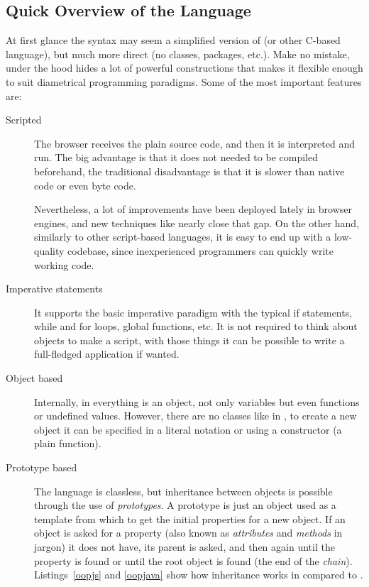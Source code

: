 \subsection{Quick Overview of the Language} %
\label{sub:overviewjavascript}

At first glance the syntax may seem a simplified version of  (or other C-based language), but much more direct (no classes, packages, etc.).
Make no mistake, under the hood  hides a lot of powerful constructions that makes it flexible enough to suit diametrical programming paradigms.
Some of the most important features are:

\begin{description}
  \item[Scripted] The browser receives the plain source code, and then it is interpreted and run.
  The big advantage is that it does not needed to be compiled beforehand, the traditional disadvantage is that it is slower than native code or even  byte code.
  
  Nevertheless, a lot of improvements have been deployed lately in browser engines, and new techniques like  nearly close that gap.
  On the other hand, similarly to other script-based languages, it is easy to end up with a low-quality codebase, since inexperienced programmers can quickly write working code.
  \item[Imperative statements] It supports the basic imperative paradigm with the typical if statements, while and for loops, global functions, etc.
  It is not required to think about objects to make a script, with those things it can be possible to write a full-fledged application if wanted.
  \item[Object based] Internally, in  everything is an object, not only variables but even functions or undefined values.
  However, there are no classes like in , to create a new object it can be specified in a literal notation or using a constructor (a plain function).
  \item[Prototype based] The language is classless, but inheritance between objects is possible through the use of \emph{prototypes}.
  A prototype is just an object used as a template from which to get the initial properties for a new object.
  If an object is asked for a property (also known as \emph{attributes} and \emph{methods} in  jargon) it does not have, its parent is asked, and then again until the property is found or until the root object is found (the end of the \emph{chain}).
  Listings~\ref{oopjs} and \ref{oopjava} show how inheritance works in  compared to .
  

\end{description}
